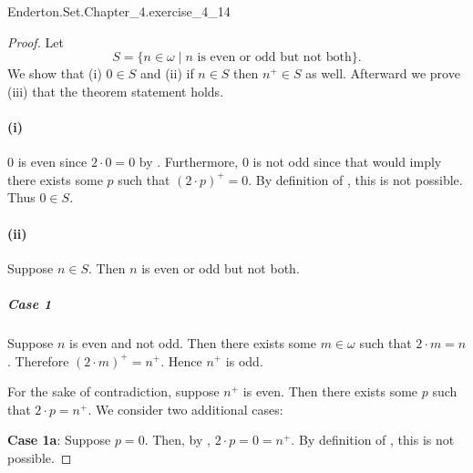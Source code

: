 \documentclass{report}
\begin{document}
    {Enderton.Set.Chapter\_4.exercise\_4\_14}

  \begin{proof}

    Let $$S = \{n \in \omega \mid n \text{ is even or odd but not both}\}.$$
    We show that (i) $0 \in S$ and (ii) if $n \in S$ then $n^+ \in S$ as well.
    Afterward we prove (iii) that the theorem statement holds.

    \paragraph{(i)}%

      $0$ is even since $2 \cdot 0 = 0$ by .
      Furthermore, $0$ is not odd since that would imply there exists some
        $p$ such that $(2 \cdot p)^+ = 0$.
      By definition of , this is not possible.
      Thus $0 \in S$.

    \paragraph{(ii)}%

      Suppose $n \in S$.
      Then $n$ is even or odd but not both.

      \subparagraph{Case 1}%

        Suppose $n$ is even and not odd.
        Then there exists some $m \in \omega$ such that $2 \cdot m = n$.
        Therefore $(2 \cdot m)^+ = n^+$.
        Hence $n^+$ is odd.

        For the sake of contradiction, suppose $n^+$ is even.
        Then there exists some $p$ such that $2 \cdot p = n^+$.
        We consider two additional cases:

        \vspace{8pt}\quad
        \textbf{Case 1a}: Suppose $p = 0$.
        Then, by , $2 \cdot p = 0 = n^+$.
        By definition of , this is not possible. 


\end{proof}
\end{document}
